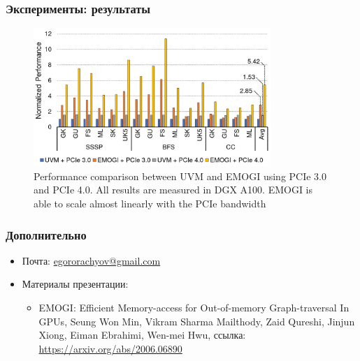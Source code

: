 \documentclass[xcolor=table,english]{beamer}
\begin{document}
\begin{frame}[fragile] \frametitle{Эксперименты: результаты}
     \begin{center}
    \begin{minipage}[m]{0.95\linewidth}
        \begin{figure}
            \centering
            \includegraphics[width=0.8\textwidth]{figures/scalability.png}
            \caption{Performance comparison between UVM and EMOGI using PCIe 3.0 and PCIe 4.0. All results are measured in DGX A100. EMOGI is able to scale almost linearly with the PCIe bandwidth}
        \end{figure}
    \end{minipage}\hfill
    \end{center}
\end{frame}

\begin{frame} \frametitle{Дополнительно}
    \begin{itemize}
        \item Почта: \href{mailto:egororachyov@gmail.com}{egororachyov@gmail.com}
        \item Материалы презентации:
        {
            \begin{itemize}
                \item {EMOGI: Efficient Memory-access for Out-of-memory Graph-traversal In GPUs, Seung Won Min, Vikram Sharma Mailthody, Zaid Qureshi, Jinjun Xiong, Eiman Ebrahimi, Wen-mei Hwu, ссылка: 
              \href{https://arxiv.org/abs/2006.06890}{https://arxiv.org/abs/2006.06890}} 
            \end{itemize}
        }
    \end{itemize}
\end{frame}
\end{document}
